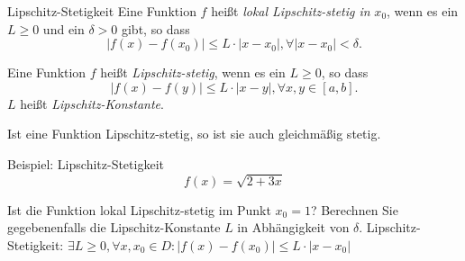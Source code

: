 \documentclass[german]{spicker}
\renewcommand{\abs}[1]{\left| #1 \right|}
\begin{document}
\begin{defi}{Lipschitz-Stetigkeit}
    Eine Funktion $f$ heißt \emph{lokal Lipschitz-stetig in} $x_0$, wenn es ein $L \geq 0$ und ein $\delta > 0$ gibt, so dass
    $$
        \abs{f(x) - f(x_0)} \leq L \cdot \abs{x-x_0}, \forall \abs{x-x_0} < \delta.
    $$

    Eine Funktion $f$ heißt \emph{Lipschitz-stetig}, wenn es ein $L \geq 0$, so dass
    $$
        \abs{f(x) - f(y)} \leq L \cdot \abs{x-y}, \forall x, y \in [a, b].
    $$
    $L$ heißt \emph{Lipschitz-Konstante}.

    Ist eine Funktion Lipschitz-stetig, so ist sie auch gleichmäßig stetig.
\end{defi}

\begin{bonus}{Beispiel: Lipschitz-Stetigkeit}\
    $$f(x) = \sqrt{2+3x}$$

    Ist die Funktion lokal Lipschitz-stetig im Punkt $x_0 = 1$?
    Berechnen Sie gegebenenfalls die Lipschitz-Konstante $L$ in Abhängigkeit von $\delta$.
    Lipschitz-Stetigkeit: $\exists L \geq 0, \forall x,x_0\in D: \abs{f(x)-f(x_0)} \leq L \cdot \abs{x-x_0}$


\end{bonus}
\end{document}
